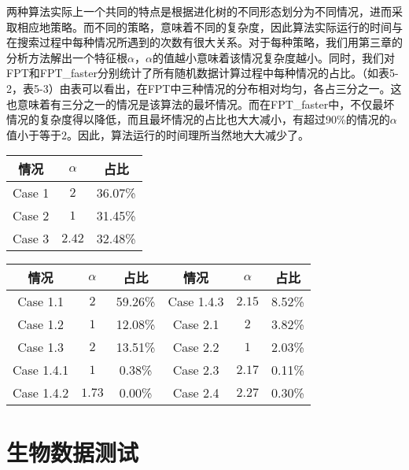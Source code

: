 
两种算法实际上一个共同的特点是根据进化树的不同形态划分为不同情况，进而采取相应地策略。而不同的策略，意味着不同的复杂度，因此算法实际运行的时间与在搜索过程中每种情况所遇到的次数有很大关系。对于每种策略，我们用第三章的分析方法解出一个特征根$\alpha$，$\alpha$的值越小意味着该情况复杂度越小。同时，我们对FPT和FPT\_faster分别统计了所有随机数据计算过程中每种情况的占比。（如表5-2，表5-3）由表可以看出，在FPT中三种情况的分布相对均匀，各占三分之一。这也意味着有三分之一的情况是该算法的最坏情况。而在FPT\_faster中，不仅最坏情况的复杂度得以降低，而且最坏情况的占比也大大减小，有超过90\%的情况的$\alpha$值小于等于$2$。因此，算法运行的时间理所当然地大大减少了。

\begin{center}
\begin{table}[htpb]
\parbox{.34\linewidth}{
\centering
{}
\begin{tabular}{ c c c}
	\hline
  		情况 & $\alpha$ & 占比\\  \hline
  		Case 1 & $2$ & 36.07\% \\
  		Case 2 & $1$ & 31.45\%\\
  		Case 3 & $2.42$ & 32.48\% \\
	\hline
\end{tabular}
}
\hfill
\parbox{.6\linewidth}{
\centering
{}
\begin{tabular}{ c c c | c c c }
	\hline
  		情况 & $\alpha$ & 占比 & 情况 & $\alpha$ & 占比\\  \hline
  		Case 1.1 & $2$ & 59.26\% & Case 1.4.3 & $2.15$ &8.52\%  \\
  		Case 1.2 & $1$ & 12.08\% & Case 2.1 & $2$ & 3.82\% \\
  		Case 1.3 & $2$ & 13.51\% & Case 2.2 & $1$ & 2.03\% \\
  		Case 1.4.1 & $1$ & 0.38\%  & Case 2.3 & $2.17$ & 0.11\% \\
  		Case 1.4.2 & $1.73$ & 0.00\% & Case 2.4 & $2.27$ & 0.30\% \\
	\hline
\end{tabular}
}
\end{table}
\end{center}


\section{生物数据测试}




















